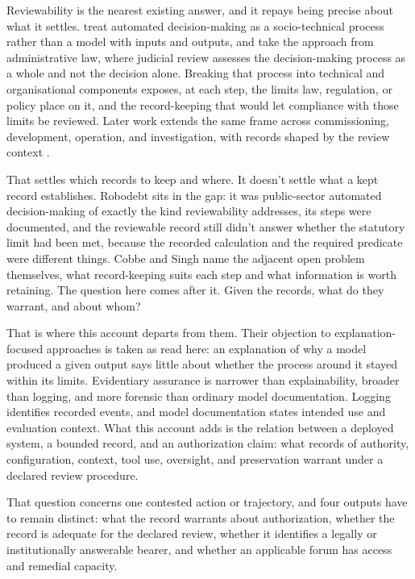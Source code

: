 Reviewability is the nearest existing answer, and it repays being precise about what it settles. \textcite{cobbeSingh2020reviewable} treat automated decision-making as a socio-technical process rather than a model with inputs and outputs, and take the approach from administrative law, where judicial review assesses the decision-making process as a whole and not the decision alone. Breaking that process into technical and organisational components exposes, at each step, the limits law, regulation, or policy place on it, and the record-keeping that would let compliance with those limits be reviewed. Later work extends the same frame across commissioning, development, operation, and investigation, with records shaped by the review context \citep{cobbeLeeSingh2021reviewable}.

That settles which records to keep and where. It doesn't settle what a kept record establishes. Robodebt sits in the gap: it was public-sector automated decision-making of exactly the kind reviewability addresses, its steps were documented, and the reviewable record still didn't answer whether the statutory limit had been met, because the recorded calculation and the required predicate were different things. Cobbe and Singh name the adjacent open problem themselves, what record-keeping suits each step and what information is worth retaining. The question here comes after it. Given the records, what do they warrant, and about whom?

That is where this account departs from them. Their objection to explanation-focused approaches is taken as read here: an explanation of why a model produced a given output says little about whether the process around it stayed within its limits. Evidentiary assurance is narrower than explainability, broader than logging, and more forensic than ordinary model documentation. Logging identifies recorded events, and model documentation states intended use and evaluation context. What this account adds is the relation between a deployed system, a bounded record, and an authorization claim: what records of authority, configuration, context, tool use, oversight, and preservation warrant under a declared review procedure.

That question concerns one contested action or trajectory, and four outputs have to remain distinct: what the record warrants about authorization, whether the record is adequate for the declared review, whether it identifies a legally or institutionally answerable bearer, and whether an applicable forum has access and remedial capacity.

